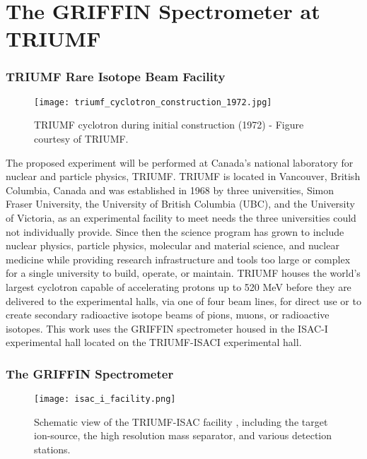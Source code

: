 \documentclass[cnatzke_thesis_proposal.tex]{subfiles}
\begin{document}
\chapter{The GRIFFIN Spectrometer at TRIUMF}

\subsection{TRIUMF Rare Isotope Beam Facility}
\begin{figure}[H]
  \begin{center}
    \texttt{[image: triumf\_cyclotron\_construction\_1972.jpg]}
  \end{center}
  \caption{TRIUMF cyclotron during initial construction (1972) - Figure courtesy of TRIUMF.}
  \label{fig:triumf_cyclotron_1972}
\end{figure}

The proposed experiment will be performed at Canada's national laboratory for nuclear and particle physics, TRIUMF. 
TRIUMF is located in Vancouver, British Columbia, Canada and was established in 1968 by three universities, Simon Fraser University, the University of British Columbia (UBC), and the University of Victoria, as an experimental facility to meet needs the three universities could not individually provide. 
Since then the science program has grown to include nuclear physics, particle physics, molecular and material science, and nuclear medicine while providing research infrastructure and tools too large or complex for a single university to build, operate, or maintain. 
TRIUMF houses the world's largest cyclotron \cite{dilling_isac_2014} capable of accelerating protons up to 520 MeV before they are delivered to the experimental halls, via one of four beam lines, for direct use or to create secondary radioactive isotope beams of pions, muons, or radioactive isotopes. 
This work uses the GRIFFIN spectrometer housed in the ISAC-I experimental hall located on the TRIUMF-ISACI experimental hall. 

\subsection{The GRIFFIN Spectrometer}

\begin{center}
\begin{figure}[H]
  \begin{center}
    \texttt{[image: isac\_i\_facility.png]}
  \end{center}
  \caption{Schematic view of the TRIUMF-ISAC facility \cite{Dilling2014}, including the target ion-source, the high resolution mass separator, and various detection stations.}
  \label{fig:ISAC_HALL}
\end{figure}
\end{center}
\end{document}
